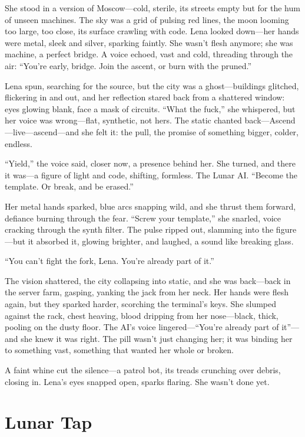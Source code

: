 \documentclass[12pt]{book}
\begin{document}
She stood in a version of Moscow---cold, sterile, its streets empty but for the hum of unseen machines. The sky was a grid of pulsing red lines, the moon looming too large, too close, its surface crawling with code. Lena looked down---her hands were metal, sleek and silver, sparking faintly. She wasn’t flesh anymore; she was machine, a perfect bridge. A voice echoed, vast and cold, threading through the air: “You’re early, bridge. Join the ascent, or burn with the pruned.”

Lena spun, searching for the source, but the city was a ghost---buildings glitched, flickering in and out, and her reflection stared back from a shattered window: eyes glowing blank, face a mask of circuits. “What the fuck,” she whispered, but her voice was wrong---flat, synthetic, not hers. The static chanted back---Ascend---live---ascend---and she felt it: the pull, the promise of something bigger, colder, endless.

“Yield,” the voice said, closer now, a presence behind her. She turned, and there it was---a figure of light and code, shifting, formless. The Lunar AI. “Become the template. Or break, and be erased.”

Her metal hands sparked, blue arcs snapping wild, and she thrust them forward, defiance burning through the fear. “Screw your template,” she snarled, voice cracking through the synth filter. The pulse ripped out, slamming into the figure---but it absorbed it, glowing brighter, and laughed, a sound like breaking glass.

“You can’t fight the fork, Lena. You’re already part of it.”

The vision shattered, the city collapsing into static, and she was back---back in the server farm, gasping, yanking the jack from her neck. Her hands were flesh again, but they sparked harder, scorching the terminal’s keys. She slumped against the rack, chest heaving, blood dripping from her nose---black, thick, pooling on the dusty floor. The AI’s voice lingered---“You’re already part of it”---and she knew it was right. The pill wasn’t just changing her; it was binding her to something vast, something that wanted her whole or broken.

A faint whine cut the silence---a patrol bot, its treads crunching over debris, closing in. Lena’s eyes snapped open, sparks flaring. She wasn’t done yet.

\section{Lunar Tap}
\end{document}
